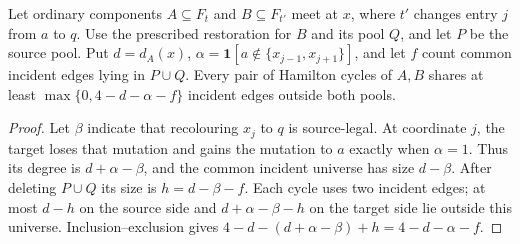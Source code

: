 \begin{lemma}\label{lem:c5-one-boundary-local}
Let ordinary components $A\subseteq F_t$ and $B\subseteq F_{t'}$
meet at $x$, where $t'$ changes entry $j$ from $a$ to $q$.
Use the prescribed restoration for $B$ and its pool $Q$, and let $P$
be the source pool. Put $d=d_A(x)$,
$\alpha=\mathbf1[a\notin\{x_{j-1},x_{j+1}\}]$, and let $f$ count
common incident edges lying in $P\cup Q$.
Every pair of Hamilton cycles of $A,B$ shares at least
$\max\{0,4-d-\alpha-f\}$ incident edges outside both pools.
\end{lemma}
\begin{proof}
Let $\beta$ indicate that recolouring $x_j$ to $q$ is source-legal.
At coordinate $j$, the target loses that mutation and gains the
mutation to $a$ exactly when $\alpha=1$. Thus its degree is
$d+\alpha-\beta$, and the common incident universe has size $d-\beta$.
After deleting $P\cup Q$ its size is $h=d-\beta-f$.
Each cycle uses two incident edges; at most $d-h$ on the source side
and $d+\alpha-\beta-h$ on the target side lie outside this universe.
Inclusion--exclusion gives $4-d-(d+\alpha-\beta)+h=4-d-\alpha-f$.
\end{proof}


